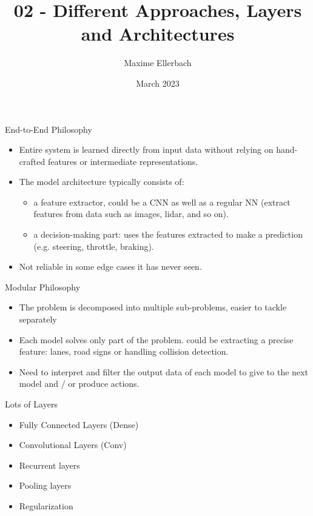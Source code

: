 \documentclass{beamer}
\title{02 - Different Approaches, Layers and Architectures}
\author{Maxime Ellerbach}
\date{March 2023}
\begin{document}
\begin{frame}
    \titlepage
\end{frame}


\begin{frame}{End-to-End Philosophy}    
    \begin{itemize}
    \item Entire system is learned directly from input data without relying on hand-crafted features or intermediate representations.
    \item The model architecture typically consists of:
    \begin{itemize}
    \item a feature extractor, could be a CNN as well as a regular NN (extract features from data such as images, lidar, and so on).
    \item a decision-making part: uses the features extracted to make a prediction (e.g. steering, throttle, braking).
    \end{itemize}
    \item Not reliable in some edge cases it has never seen.
    \end{itemize}
\end{frame}


\begin{frame}{Modular Philosophy}
    \begin{itemize}
    \item The problem is decomposed into multiple sub-problems, easier to tackle separately
    \item Each model solves only part of the problem. could be extracting a precise feature: lanes, road signs or handling collision detection.
    \item Need to interpret and filter the output data of each model to give to the next model and / or produce actions.
    \end{itemize}
\end{frame}


\begin{frame}{Lots of Layers}
    \begin{itemize}
        \item Fully Connected Layers (Dense)
        \item Convolutional Layers (Conv)
        \item Recurrent layers
        \item Pooling layers
        \item Regularization
    \end{itemize}
    
\end{frame}
\end{document}
